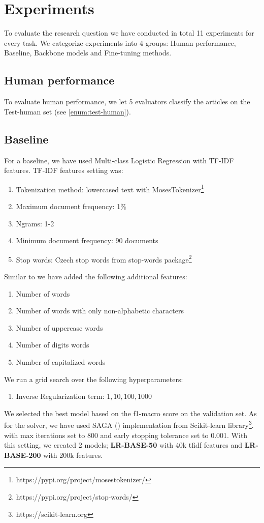 \chapter{Experiments}
\label{chap:experiments}
To evaluate the research question we have conducted in total 11 experiments for every task.
We categorize experiments into 4 groups: Human performance, Baseline, Backbone models and Fine-tuning methods.

\section{Human performance}
\label{sec:human}
To evaluate human performance, we let 5 evaluators classify the articles on the Test-human set (see \autoref{enum:test-human}).

\section{Baseline}
For a baseline, we have used Multi-class Logistic Regression with TF-IDF features.
TF-IDF features setting was:
\begin{enumerate}
    \item Tokenization method: lowercased text with MosesTokenizer\footnote{https://pypi.org/project/mosestokenizer/}
    \item Maximum document frequency: 1\%
    \item Ngrams: 1-2
    \item Minimum document frequency: 90 documents
    \item Stop words: Czech stop words from stop-words package\footnote{https://pypi.org/project/stop-words/}
\end{enumerate}
Similar to \cite{strakaSumeCzechLargeCzech2018a} we have added the following additional features:
\begin{enumerate}
    \item Number of words
    \item Number of words with only non-alphabetic characters
    \item Number of uppercase words
    \item Number of digits words
    \item Number of capitalized words
\end{enumerate}


We run a grid search over the following hyperparameters:
\begin{enumerate}
    \item Inverse Regularization term: $1, 10, 100, 1000$
\end{enumerate}
We selected the best model based on the f1-macro score on the validation set.
As for the solver, we have used SAGA (\cite{defazioSAGAFastIncremental2014})
 implementation from Scikit-learn library\footnote{https://scikit-learn.org}.
with max iterations set to 800 and early stopping tolerance set to 0.001.
With this setting, we created 2 models; \textbf{LR-BASE-50} with 40k tfidf features
 and \textbf{LR-BASE-200} with 200k features.

